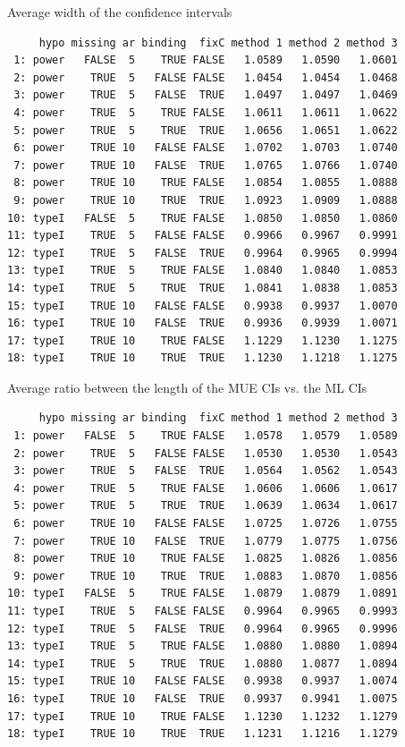 \documentclass[12pt]{article}
\begin{document}
Average width of the confidence intervals
\begin{verbatim}
     hypo missing ar binding  fixC method 1 method 2 method 3
 1: power   FALSE  5    TRUE FALSE   1.0589   1.0590   1.0601
 2: power    TRUE  5   FALSE FALSE   1.0454   1.0454   1.0468
 3: power    TRUE  5   FALSE  TRUE   1.0497   1.0497   1.0469
 4: power    TRUE  5    TRUE FALSE   1.0611   1.0611   1.0622
 5: power    TRUE  5    TRUE  TRUE   1.0656   1.0651   1.0622
 6: power    TRUE 10   FALSE FALSE   1.0702   1.0703   1.0740
 7: power    TRUE 10   FALSE  TRUE   1.0765   1.0766   1.0740
 8: power    TRUE 10    TRUE FALSE   1.0854   1.0855   1.0888
 9: power    TRUE 10    TRUE  TRUE   1.0923   1.0909   1.0888
10: typeI   FALSE  5    TRUE FALSE   1.0850   1.0850   1.0860
11: typeI    TRUE  5   FALSE FALSE   0.9966   0.9967   0.9991
12: typeI    TRUE  5   FALSE  TRUE   0.9964   0.9965   0.9994
13: typeI    TRUE  5    TRUE FALSE   1.0840   1.0840   1.0853
14: typeI    TRUE  5    TRUE  TRUE   1.0841   1.0838   1.0853
15: typeI    TRUE 10   FALSE FALSE   0.9938   0.9937   1.0070
16: typeI    TRUE 10   FALSE  TRUE   0.9936   0.9939   1.0071
17: typeI    TRUE 10    TRUE FALSE   1.1229   1.1230   1.1275
18: typeI    TRUE 10    TRUE  TRUE   1.1230   1.1218   1.1275
\end{verbatim}

Average ratio between the length of the MUE CIs vs. the ML CIs
\begin{verbatim}
     hypo missing ar binding  fixC method 1 method 2 method 3
 1: power   FALSE  5    TRUE FALSE   1.0578   1.0579   1.0589
 2: power    TRUE  5   FALSE FALSE   1.0530   1.0530   1.0543
 3: power    TRUE  5   FALSE  TRUE   1.0564   1.0562   1.0543
 4: power    TRUE  5    TRUE FALSE   1.0606   1.0606   1.0617
 5: power    TRUE  5    TRUE  TRUE   1.0639   1.0634   1.0617
 6: power    TRUE 10   FALSE FALSE   1.0725   1.0726   1.0755
 7: power    TRUE 10   FALSE  TRUE   1.0779   1.0775   1.0756
 8: power    TRUE 10    TRUE FALSE   1.0825   1.0826   1.0856
 9: power    TRUE 10    TRUE  TRUE   1.0883   1.0870   1.0856
10: typeI   FALSE  5    TRUE FALSE   1.0879   1.0879   1.0891
11: typeI    TRUE  5   FALSE FALSE   0.9964   0.9965   0.9993
12: typeI    TRUE  5   FALSE  TRUE   0.9964   0.9965   0.9996
13: typeI    TRUE  5    TRUE FALSE   1.0880   1.0880   1.0894
14: typeI    TRUE  5    TRUE  TRUE   1.0880   1.0877   1.0894
15: typeI    TRUE 10   FALSE FALSE   0.9938   0.9937   1.0074
16: typeI    TRUE 10   FALSE  TRUE   0.9937   0.9941   1.0075
17: typeI    TRUE 10    TRUE FALSE   1.1230   1.1232   1.1279
18: typeI    TRUE 10    TRUE  TRUE   1.1231   1.1216   1.1279
\end{verbatim}
\end{document}
